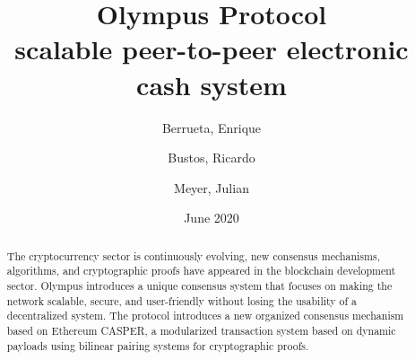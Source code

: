 \documentclass{article}
\title{%
  Olympus Protocol \\
  \largeA scalable peer-to-peer electronic cash system}
\author{
  Berrueta, Enrique\\
  \and
  Bustos, Ricardo\\
  \and
  Meyer, Julian
}
\date{June 2020}
\begin{document}
	\maketitle
	\begin{abstract}
		The cryptocurrency sector is continuously evolving, new consensus mechanisms, algorithms, and cryptographic proofs have appeared in the blockchain development sector. Olympus introduces a unique consensus system that focuses on making the network scalable, secure, and user-friendly without losing the usability of a decentralized system. The protocol introduces a new organized consensus mechanism based on Ethereum CASPER, a modularized transaction system based on dynamic payloads using bilinear pairing systems for cryptographic proofs.
	\end{abstract}
	
	\newpage
	\tableofcontents		
	
\end{document}
